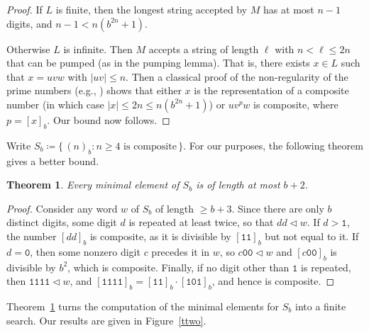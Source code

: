 \documentclass[12pt]{article}
\def\subw{\mathrel{\triangleleft}}
\theoremstyle{plain}
\newtheorem{theorem}{Theorem}
\theoremstyle{definition}
\newcommand{\0}{\mathtt{0}}
\newcommand{\1}{\mathtt{1}}
\newcommand{\2}{\mathtt{2}}
\newcommand{\3}{\mathtt{3}}
\newcommand{\4}{\mathtt{4}}
\newcommand{\5}{\mathtt{5}}
\newcommand{\6}{\mathtt{6}}
\newcommand{\7}{\mathtt{7}}
\newcommand{\8}{\mathtt{8}}
\newcommand{\9}{\mathtt{9}}
\newcommand{\set}[2]{\{\,#1{}:{}#2\,\}}
\begin{document}
\begin{proof}
If $L$ is finite, then the longest string accepted by $M$ has
at most $n-1$ digits, and $n-1 < n(b^{2n} + 1)$.

Otherwise $L$ is infinite.  Then $M$ accepts a string of length
$\ell$ with $n < \ell \leq 2n$ that can be pumped (as in the
pumping lemma).  That is, there exists $x \in L$ such that
$x = uvw$ with $|uv| \leq n$.  Then a classical proof of the
non-regularity of the prime numbers 
(e.g., \cite[Example 3.2, p.\ 57]{HU79})
shows that either $x$ is the representation of a composite 
number (in which case $|x| \leq 2n \leq n(b^{2n} + 1)$)
or $u v^p w$ is composite, where $p = [x]_b$.  
Our bound now follows.
\end{proof}

Write $S_b \coloneqq \set{(n)_b}{\text{$n \geq 4$ is composite}}$.
For our purposes, the following theorem gives a better bound.

\begin{theorem}
Every minimal element of\/ $S_b$ is of length at most\/ $b+2$.
\label{devi}
\end{theorem}

\begin{proof}
Consider any word $w$ of $S_b$ of length $\geq b+3$.   Since there are only
$b$ distinct digits, some digit $d$ is repeated at least twice,
so that $dd \subw w$.  If $d > \1$, the number $[dd]_b$ is composite,
as it is divisible by $[\1\1]_b$ but not equal to it.  If $d = \0$,
then some nonzero digit $c$ precedes it in $w$, so $c\0\0 \subw w$
and $[c\0\0]_b$ is divisible by $b^2$, which is composite.
Finally, if no digit other than $\1$ is repeated, then 
$\1\1\1\1 \subw w$, and $[\1\1\1\1]_b = [\1\1]_b \cdot [\1\0\1]_b$, and hence
is composite.
\end{proof}

Theorem~\ref{devi} turns the computation of the minimal elements for
$S_b$ into a finite search.  Our results are given in Figure~\ref{ttwo}.
\end{document}

